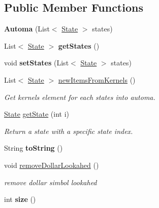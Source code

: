\subsection*{Public Member Functions}
\begin{DoxyCompactItemize}
\item 
\hypertarget{classcontext_free_1_1scanner_1_1_automa_a4d849a0068a3e9f284cd85d6b452f273}{{\bfseries Automa} (List$<$ \hyperlink{classcontext_free_1_1scanner_1_1_state}{State} $>$ states)}\label{classcontext_free_1_1scanner_1_1_automa_a4d849a0068a3e9f284cd85d6b452f273}

\item 
\hypertarget{classcontext_free_1_1scanner_1_1_automa_a3ffe7f601979b7816c632c8234828970}{List$<$ \hyperlink{classcontext_free_1_1scanner_1_1_state}{State} $>$ {\bfseries get\-States} ()}\label{classcontext_free_1_1scanner_1_1_automa_a3ffe7f601979b7816c632c8234828970}

\item 
\hypertarget{classcontext_free_1_1scanner_1_1_automa_a71f454623cb55965b88d9209833beed2}{void {\bfseries set\-States} (List$<$ \hyperlink{classcontext_free_1_1scanner_1_1_state}{State} $>$ states)}\label{classcontext_free_1_1scanner_1_1_automa_a71f454623cb55965b88d9209833beed2}

\item 
List$<$ \hyperlink{classcontext_free_1_1scanner_1_1_state}{State} $>$ \hyperlink{classcontext_free_1_1scanner_1_1_automa_a7cb3536eab5b56faee50dafd8de978ad}{new\-Items\-From\-Kernels} ()
\begin{DoxyCompactList}\small\item\em Get kernels element for each states into automa. \end{DoxyCompactList}\item 
\hyperlink{classcontext_free_1_1scanner_1_1_state}{State} \hyperlink{classcontext_free_1_1scanner_1_1_automa_a1c916160a989c51dde68e032de19744f}{get\-State} (int i)
\begin{DoxyCompactList}\small\item\em Return a state with a specific state index. \end{DoxyCompactList}\item 
\hypertarget{classcontext_free_1_1scanner_1_1_automa_a41a35d901a27faf5c2d1d4c779c7c68b}{String {\bfseries to\-String} ()}\label{classcontext_free_1_1scanner_1_1_automa_a41a35d901a27faf5c2d1d4c779c7c68b}

\item 
void \hyperlink{classcontext_free_1_1scanner_1_1_automa_aae82c530ffa9a9ea010de9eb9f77707d}{remove\-Dollar\-Lookahed} ()
\begin{DoxyCompactList}\small\item\em remove dollar simbol lookahed \end{DoxyCompactList}\item 
\hypertarget{classcontext_free_1_1scanner_1_1_automa_a2628fb9e864cbd63a8b9e72295eff59b}{int {\bfseries size} ()}\label{classcontext_free_1_1scanner_1_1_automa_a2628fb9e864cbd63a8b9e72295eff59b}

\end{DoxyCompactItemize}
